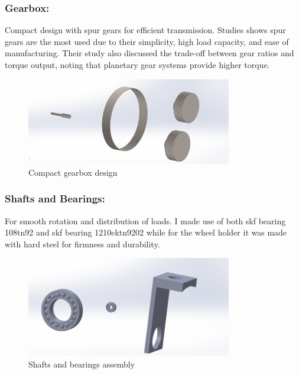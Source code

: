 \documentclass[../../main]{subfiles}
\begin{document}
\subsubsection{Gearbox:}
Compact design with spur gears for efficient transmission.
Studies shows spur gears are the most used due to their simplicity, high
load capacity, and ease of manufacturing. Their study also discussed the
trade-off between gear ratios and torque output, noting that planetary
gear systems provide higher torque.
\begin{figure}[h]
  \centering
  \includegraphics[width=0.8\textwidth]{sublatex/Opryrmi/media/image3.png} 
  \caption{Compact gearbox design}
\end{figure}

\subsubsection{Shafts and Bearings:} 
For smooth rotation and distribution of loads.
I made use of both skf bearing 108tn92 and skf bearing 1210ektn9202
while for the wheel holder it was made with hard steel for firmness and
durability.
\begin{figure}[h]
  \centering
  \includegraphics[width=0.8\textwidth]{sublatex/Opryrmi/media/image4.png} 
  \caption{Shafts and bearings assembly}
\end{figure}
\end{document}
